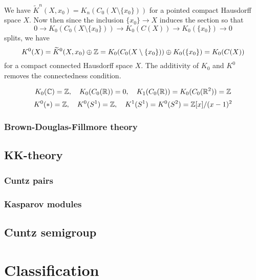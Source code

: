 \documentclass{../../large}
\begin{document}
We have $\tilde K^n(X,x_0)=K_n(C_0(X\setminus\{x_0\}))$ for a pointed compact Hausdorff space $X$.
Now then since the inclusion $\{x_0\}\to X$ induces the section so that
\[0\to K_0(C_0(X\setminus\{x_0\}))\to K_0(C(X))\to K_0(\{x_0\})\to0\]
splits, we have
\[K^0(X)=\widetilde K^0(X,x_0)\oplus\mathbb{Z}=K_0(C_0(X\setminus\{x_0\}))\oplus K_0(\{x_0\})=K_0(C(X))\]
for a compact connected Hausdorff space $X$.
The additivity of $K_0$ and $K^0$ removes the connectedness condition.

\[K_0(\mathbb{C})=\mathbb{Z},\quad K_0(C_0(\mathbb{R}))=0,\quad K_1(C_0(\mathbb{R}))=K_0(C_0(\mathbb{R}^2))=\mathbb{Z}\]
\[K^0(*)=\mathbb{Z},\quad K^0(S^1)=\mathbb{Z},\quad K^1(S^1)=K^0(S^2)=\mathbb{Z}[x]/(x-1)^2\]





\section{Brown-Douglas-Fillmore theory}
\begin{prb}
\end{prb}










\chapter{KK-theory}

\section{Cuntz pairs}

\section{Kasparov modules}






\chapter{Cuntz semigroup}











\part{Classification}
\end{document}
